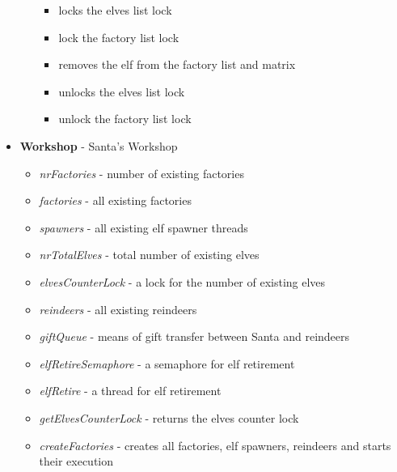 \documentclass{article}
\begin{document}
\begin{itemize}
\begin{itemize}
\begin{itemize}
                        \item locks the elves list lock
                        \item lock the factory list lock
                        \item removes the elf from the factory list and matrix
                        \item unlocks the elves list lock
                        \item unlock the factory list lock
                    \end{itemize}
            \end{itemize}
            \item \textbf{Workshop} - Santa's Workshop
                \begin{itemize}
                    \item \textit{nrFactories} - number of existing factories
                    \item \textit{factories} - all existing factories
                    \item \textit{spawners} - all existing elf spawner threads
                    \item \textit{nrTotalElves} - total number of existing elves
                    \item \textit{elvesCounterLock} - a lock for the number of existing elves
                    \item \textit{reindeers} - all existing reindeers
                    \item \textit{giftQueue} - means of gift transfer between Santa and reindeers
                    \item \textit{elfRetireSemaphore} - a semaphore for elf retirement
                    \item \textit{elfRetire} - a thread for elf retirement
                    \item \textit{getElvesCounterLock} - returns the elves counter lock
                    \item \textit{createFactories} - creates all factories, elf spawners, reindeers and starts their execution
                \end{itemize}
                
        \end{itemize}
    
    
    
\end{document}

